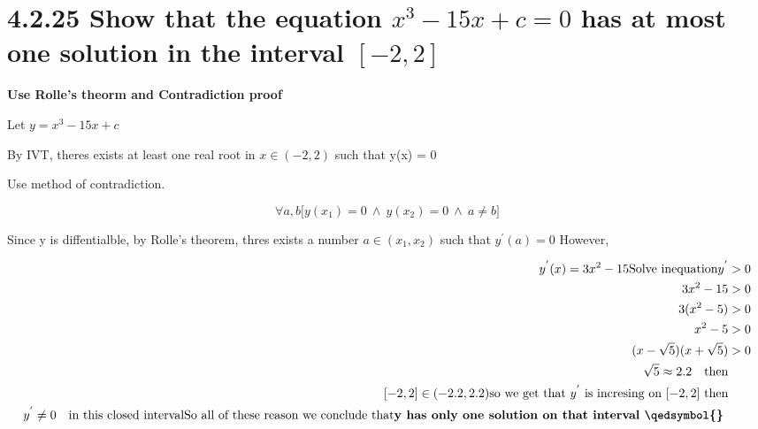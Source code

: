 \section*{4.2.25
    \textbf{
        Show that the equation $x^3 - 15x + c = 0$ has at most one solution in the interval $[-2,2]$
    }
}

\textbf{Use Rolle's theorm and Contradiction proof}

Let
$
    y = x^3 - 15x + c
$
\par
By IVT, theres exists at least one real root in $x \in (-2,2)$ such that y(x) = 0

\par
Use method of contradiction.

\par
\[
    \forall a,b
    \biggl[
        y(x_1) = 0
       \: \land \:
        y(x_2) = 0
       \: \land \:
        a \neq b
    \biggr]
\]

\par
Since y is diffentialble, by Rolle's theorem, thres exists a number $
a \in (x_1, x_2)$ such that $y^{'}(a) = 0$
However,

\begin{align}
\begin{split}
    y^{'}(x) = 3x^2 - 15

    \text{Solve inequation}

    y^{'} &> 0 \\
    3x^2 - 15 &> 0 \\
    3(x^2 - 5) &> 0 \\
    x^2 - 5 &> 0 \\
    (x - \sqrt{5})(x + \sqrt{5}) &> 0 \\

    \sqrt{5} \approx 2.2 \quad \text{then} \\
    [-2,2] \in (-2.2, 2.2)

    \text{so we get that $y^{'}$ is incresing on $[-2,2]$   then} \\
    y^{'} \neq 0 \quad \text{in this closed interval}

    \text{So all of these reason we conclude that}
    \textbf{y has only one solution on that interval \qedsymbol{} }

\end{split}
\end{align}
